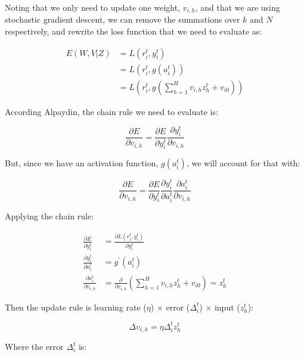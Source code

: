 \documentclass{article}
\begin{document}
Noting that we only need to update one weight, $v_{i,h}$, and that we are using stochastic gradient descent, we can remove the summations over $k$ and $N$ respectively, and rewrite the loss function that we need to evaluate as:

\begin{equation}
\begin{aligned}
E(W, V|Z) &= L(r_i^t, y_i^t) \\
&= L(r_i^t, g(a_i^t)) \\
&= L(r_i^t, g( \sum\limits_{h=1}^H v_{i,h} z_h^t +v_{i0}))
\end{aligned}
\end{equation}

According Alpaydin, the chain rule we need to evaluate is:

\begin{equation}
\frac{\partial E}{\partial v_{i,h}} = \frac{\partial E} {\partial y_i^t} \frac{\partial y_i^t} {\partial v_{i,h}}
\end{equation}

But, since we have an activation function, $g ( a_i^t )$, we will account for that with:

\begin{equation}
\frac{\partial E}{\partial v_{i,h}} = \frac{\partial E} {\partial y_i^t} \frac{\partial y_i^t} {\partial a_i^t} \frac{ \partial a_i^t }{\partial v_{i,h}}
\end{equation}

Applying the chain rule:

\begin{equation}
\begin{aligned}
\frac{\partial E}{\partial y_i^t} &= \frac{\partial L (r_i^t, y_i^t)}{\partial y_i^t} \\
\frac{\partial y_i^t}{\partial a_i^t} &= g^{'}(a_i^t) \\
\frac{ \partial a_i^t }{\partial v_{i,h}} &= \frac{ \partial }{\partial v_{i,h}} ( \sum\limits_{h=1}^H v_{i,h} z_h^t +v_{i0} ) = z_h^t
\end{aligned}
\end{equation}

Then the update rule is learning rate ($\eta$) $\times$ error ($\Delta_i^t$) $\times$ input ($z_h^t$):

\begin{equation}
\Delta v_{i,h} = \eta \Delta_i^t z_h^t
\end{equation}

Where the error $\Delta_i^t$ is:
\end{document}
